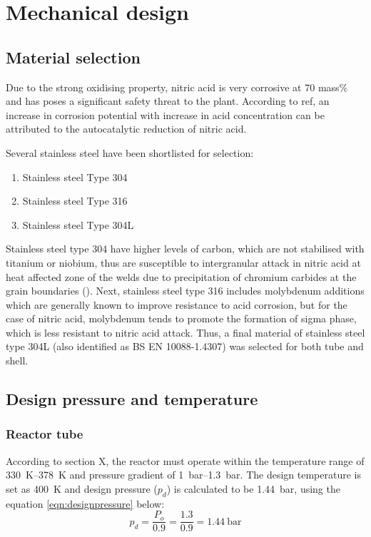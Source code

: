 \section{Mechanical design}
\subsection{Material selection}
Due to the strong oxidising property, nitric acid is very corrosive at 70 mass\% and has poses a significant safety threat to the plant. According to ref, an increase in corrosion potential with increase in acid concentration can be attributed to the autocatalytic reduction of nitric acid. 

Several stainless steel have been shortlisted for selection: 
\begin{enumerate}
    \item Stainless steel Type 304
    \item Stainless steel Type 316
    \item Stainless steel Type 304L
\end{enumerate}

Stainless steel type 304 have higher levels of carbon, which are not stabilised with titanium or niobium, thus are susceptible to intergranular attack in nitric acid at heat affected zone of the welds due to precipitation of chromium carbides at the grain boundaries (). Next, stainless steel type 316 includes molybdenum additions which are generally known to improve resistance to acid corrosion, but for the case of nitric acid, molybdenum tends to promote the formation of sigma phase, which is less resistant to nitric acid attack. Thus, a final material of stainless steel type 304L (also identified as BS EN 10088-1.4307) was selected for both tube and shell.

\subsection{Design pressure and temperature}
\subsubsection{Reactor tube}
According to section X, the reactor must operate within the temperature range of \SIrange{330}{378}{\K} and pressure gradient of \SIrange{1}{1.3}{\bar}. The design temperature is set as \SI{400}{\K} and design pressure ($p_d$) is calculated to be \SI{1.44}{\bar}, using the equation \ref{eqn:designpressure} below:
\begin{equation}
    p_d = \frac{P_o}{0.9} = \frac{1.3}{0.9} = \SI{1.44}{\bar}
    \label{eqn:designpressure}
\end{equation}
